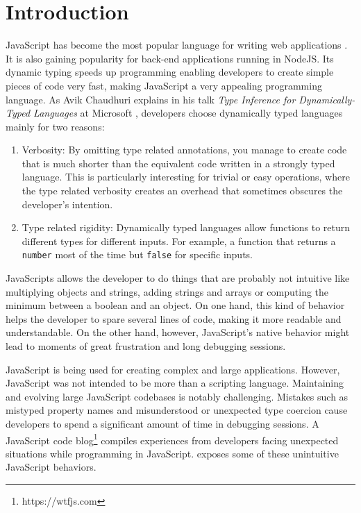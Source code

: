 \chapter{Introduction}\label{chap:introduction}

JavaScript has become the most popular language for writing web applications \citep{github-statistics}. It is also gaining popularity for back-end applications running in NodeJS. Its dynamic typing speeds up programming enabling developers to create simple pieces of code very fast, making JavaScript a very appealing programming language. As Avik Chaudhuri explains in his talk \textit{Type Inference for Dynamically-Typed Languages} at Microsoft \citep{type-inference-microsoft-research-video}, developers choose dynamically typed languages mainly for two reasons:

\begin{enumerate}
	\item Verbosity: By omitting type related annotations, you manage to create code that is much shorter than the equivalent code written in a strongly typed language. This is particularly interesting for trivial or easy operations, where the type related verbosity creates an overhead that sometimes obscures the developer's intention.

	\item Type related rigidity: Dynamically typed languages allow functions to return different types for different inputs. For example, a function that returns a \texttt{number} most of the time but \texttt{false} for specific inputs.
\end{enumerate}

JavaScripts allows the developer to do things that are probably not intuitive like multiplying objects and strings, adding strings and arrays or computing the minimum between a boolean and an object. On one hand, this kind of behavior helps the developer to spare several lines of code, making it more readable and understandable. On the other hand, however, JavaScript's native behavior might lead to moments of great frustration and long debugging sessions.

JavaScript is being used for creating complex and large applications. However, JavaScript was not intended to be more than a scripting language. Maintaining and evolving large JavaScript codebases is notably challenging. Mistakes such as mistyped property names and misunderstood or unexpected type coercion cause developers to spend a significant amount of time in debugging sessions. A JavaScript code blog\footnote{https://wtfjs.com} compiles experiences from developers facing unexpected situations while programming in JavaScript.  exposes some of these unintuitive JavaScript behaviors.

